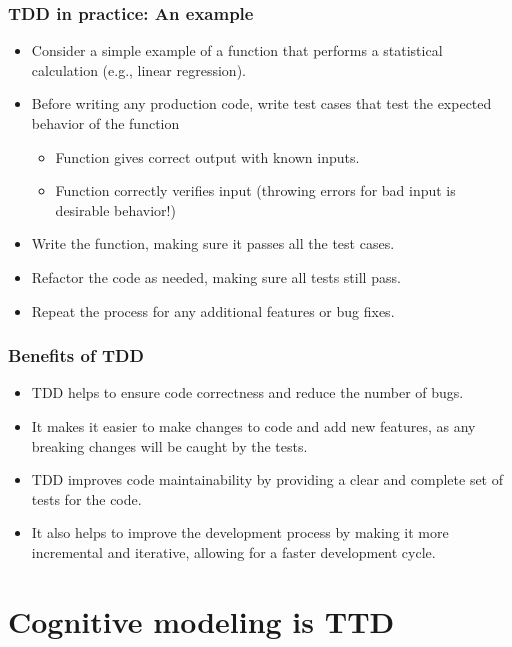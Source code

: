 \begin{frame}
\frametitle{TDD in practice: An example}
\begin{itemize}
\item Consider a simple example of a function that performs a statistical calculation (e.g., linear regression).
\item Before writing any production code, write test cases that test the expected behavior of the function
\begin{itemize}
\item Function gives correct output with known inputs.
\item Function correctly verifies input (throwing errors for bad input is desirable behavior!)
\end{itemize}
\item Write the function, making sure it passes all the test cases.
\item Refactor the code as needed, making sure all tests still pass.
\item Repeat the process for any additional features or bug fixes.
\end{itemize}
\end{frame}

\begin{frame}
\frametitle{Benefits of TDD}
\begin{itemize}
\item TDD helps to ensure code correctness and reduce the number of bugs.
\item It makes it easier to make changes to code and add new features, as any breaking changes will be caught by the tests.
\item TDD improves code maintainability by providing a clear and complete set of tests for the code.
\item It also helps to improve the development process by making it more incremental and iterative, allowing for a faster development cycle.
\end{itemize}
\end{frame}


\section{Cognitive modeling is TTD}

